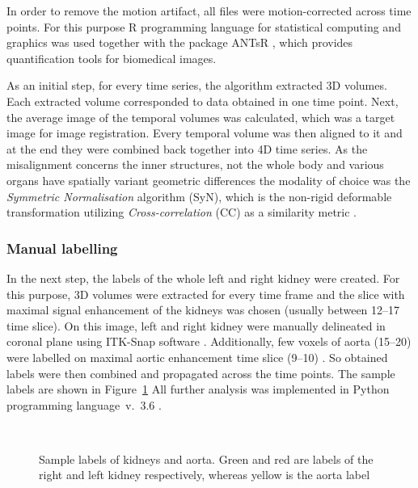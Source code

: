 In order to remove 	the motion artifact, all files were motion-corrected across time points. For this purpose R programming language for statistical computing and graphics was used \cite{R} together with the package ANTsR \cite{ANTsR}, which provides quantification tools for biomedical images. 

As an initial step, for every time series, the algorithm extracted 3D volumes. Each extracted volume corresponded to data obtained in one time point. Next, the average image of the temporal volumes was calculated, which was a target image for image registration. Every temporal volume was then aligned to it and at the end they were combined back together into 4D time series.
As the misalignment concerns the inner structures, not the whole body and various organs have spatially variant geometric differences the modality of choice was the  \textit{Symmetric Normalisation} algorithm (SyN), which is the non-rigid deformable transformation utilizing \textit{Cross-correlation} (CC) as a similarity metric \cite{avants2011reproducible, avants2008symmetric, el2016current}. 

\subsubsection{Manual labelling}
In the next step, the labels of the whole left and right kidney were created. For this purpose, 3D volumes were extracted for every time frame and the slice with maximal signal enhancement of the kidneys was chosen (usually between 12--17 time slice). On this image, left and right kidney were manually delineated in coronal plane using ITK-Snap software \cite{itk-snap}. Additionally, few voxels of aorta (15--20) were labelled on maximal aortic enhancement time slice (9--10) . So obtained labels were then combined and propagated across the time points. The sample labels are shown in Figure~\ref{fig:labels}
All further analysis was implemented in Python programming language~v.~3.6 \cite{python}.

\begin{figure}
\captionsetup[subfloat]{captionskip=0.5cm}
	\centering
	\hspace{0.02\textwidth}
	\\	
\vspace{0.5cm}
\caption[Sample labels of kidneys and aorta]{Sample labels of kidneys and aorta. Green and red are labels of the right and left kidney respectively, whereas yellow is the aorta label}
\label{fig:labels}
\end{figure}


